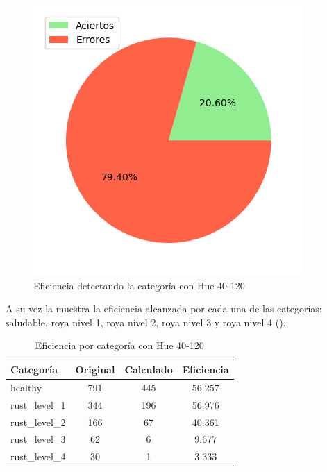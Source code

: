 \begin{figure}
\centering
\includegraphics[scale=0.6]{images/result_global_class_40_120.png}
\caption{Eficiencia detectando la categoría con Hue 40-120}
\label{img:efficiency_category_40_120}
\end{figure}

\captionsetup[figure]{skip=10pt}

A su vez la  muestra la eficiencia alcanzada por cada una de las categorías: saludable, roya nivel 1, roya nivel 2, roya nivel 3 y roya nivel 4 ().

\begin{table}[h!]
\centering
\begin{tabular}{|l|c|c|c|}
\hline 
\textbf{Categoría} & \textbf{Original} & \textbf{Calculado} & \textbf{Eficiencia} \\
\hline
healthy & 791 & 445 & 56.257 \\
\hline 
rust\_level\_1 & 344 & 196 & 56.976 \\
\hline 
rust\_level\_2 & 166 & 67 & 40.361 \\
\hline 
rust\_level\_3 & 62 & 6 & 9.677 \\
\hline 
rust\_level\_4 & 30 & 1 & 3.333 \\
\hline 
\end{tabular}
\caption{Eficiencia por categoría con Hue 40-120}
\label{table:efficiency_categories_40_120}
\end{table}

